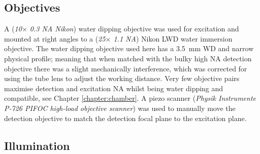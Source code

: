 
\subsection{Objectives}


A (\emph{10$\times$ 0.3 NA Nikon}) water dipping objective was used for excitation and mounted at right angles to a (\emph{25$\times$ 1.1 NA}) Nikon LWD water immersion objective.
The water dipping objective used here has a \SI{3.5}{\milli\meter} WD and narrow physical profile; meaning that when matched with the bulky high NA detection objective there was a slight mechanically interference, which was corrected for using the tube lens to adjust the working distance.%
Very few objective pairs maximise detection and excitation NA whilst being water dipping and compatible, see Chapter \ref{chapter:chamber}.
A piezo scanner (\emph{Physik Instrumente P-726 PIFOC high-load objective scanner}) was used to manually move the detection objective to match the detection focal plane to the excitation plane.

\subsection{Illumination}

